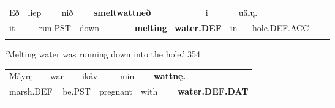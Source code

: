 \begin{listWWNumxxvileveli}
\item 

\end{listWWNumxxvileveli}

\begin{tabular}{llllllllllllll}
\lsptoprule
Eð & \multicolumn{2}{l}{liep

} & \multicolumn{2}{l}{nið

} & \multicolumn{2}{l}{{\bfseries smeltwattneð}

} & \multicolumn{2}{l}{i

} & \multicolumn{2}{l}{uäl\k{u}.

} & \multicolumn{2}{l}{} & \\
\multicolumn{2}{l}{it

} & \multicolumn{2}{l}{run.PST

} & \multicolumn{2}{l}{down

} & \multicolumn{2}{l}{{\bfseries melting\_water.DEF}

} & \multicolumn{2}{l}{in

} & \multicolumn{2}{l}{hole.DEF.ACC

} & \multicolumn{2}{l}{}\\
\lspbottomrule
\end{tabular}

\begin{styleTranslation}
‘Melting water was running down into the hole.’ 354

\end{styleTranslation}

\begin{tabular}{llllllllll}
\lsptoprule
Måyrę & \multicolumn{2}{l}{war

} & \multicolumn{2}{l}{ikåv

} & \multicolumn{2}{l}{min

} & \multicolumn{2}{l}{{\bfseries wattnę.}

} & \\
\multicolumn{2}{l}{marsh.DEF

} & \multicolumn{2}{l}{be.PST

} & \multicolumn{2}{l}{pregnant

} & \multicolumn{2}{l}{with

} & \multicolumn{2}{l}{{\bfseries water.DEF.DAT}

}\\
\lspbottomrule
\end{tabular}

